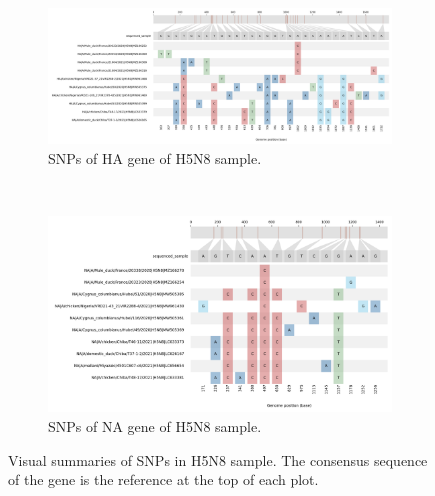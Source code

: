 \begin{figure}
\centering
    \begin{subfigure}[b]{1.1\textwidth}
        \includegraphics[width=1.0\linewidth]{media/4-aiv-snipit-s8-4-ha.png}
        \caption{SNPs of HA gene of H5N8 sample.}
    \label{fig:apx-aiv-snipit-s8-ha}
    \end{subfigure}
    \\
    \begin{subfigure}[b]{1.1\textwidth}
        \centering
        \includegraphics[width=1.0\linewidth]{media/4-aiv-snipit-s8-6-na.png}
    \caption{SNPs of NA gene of H5N8 sample.}
    \label{fig:apx-aiv-snipit-s8-na}
    \end{subfigure}
    \caption[Visual summaries of SNPs in H5N8 sample.]{Visual summaries of SNPs in H5N8 sample. The consensus sequence of the gene is the reference at the top of each plot.}
\label{fig:apx-aiv-snipit-s8}
\end{figure}

